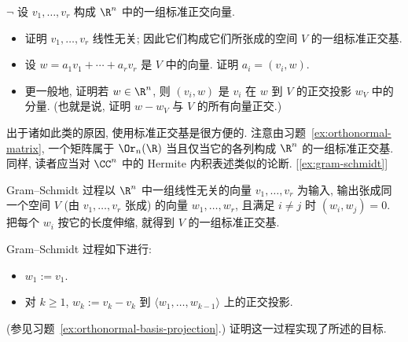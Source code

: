 \begin{prob}\label{ex:orthonormal-basis-projection}
$\neg$ 设 $v_1,\ldots,v_r$ 构成 $\R^n$ 中的一组标准正交向量.
\begin{itemize}
	\item 证明 $v_1,\ldots,v_r$ 线性无关; 因此它们构成它们所张成的空间 $V$ 的一组标准正交基.
	\item 设 $w=a_1v_1+\cdots+a_rv_r$ 是 $V$ 中的向量. 证明 $a_i=(v_i,w)$.
	\item 更一般地, 证明若 $w\in\R^n$, 则 $(v_i,w)$ 是 $v_i$ 在 $w$ 到 $V$ 的正交投影 $w_V$ 中的分量. (也就是说, 证明 $w-w_V$ 与 $V$ 的所有向量正交.)
\end{itemize}
\begin{center}
\end{center}
出于诸如此类的原因, 使用标准正交基是很方便的. 注意由习题~\ref{ex:orthonormal-matrix}, 一个矩阵属于 $\Or_n(\R)$ 当且仅当它的各列构成 $\R^n$ 的一组标准正交基. 同样, 读者应当对 $\CC^n$ 中的 Hermite 内积表述类似的论断. [\ref{ex:gram-schmidt}]
\end{prob}

\begin{prob}\label{ex:gram-schmidt}
Gram--Schmidt 过程以 $\R^n$ 中一组线性无关的向量 $v_1,\ldots,v_r$ 为输入, 输出张成同一个空间 $V$ (由 $v_1,\ldots,v_r$ 张成) 的向量 $w_1,\ldots,w_r$, 且满足 $i\neq j$ 时 $(w_i,w_j)=0$. 把每个 $w_i$ 按它的长度伸缩, 就得到 $V$ 的一组标准正交基.

Gram--Schmidt 过程如下进行:
\begin{itemize}
	\item $w_1:=v_1$.
	\item 对 $k\ge1$, $w_k:=v_k-v_k$ 到 $\langle w_1,\ldots,w_{k-1}\rangle$ 上的正交投影.
\end{itemize}
(参见习题~\ref{ex:orthonormal-basis-projection}.) 证明这一过程实现了所述的目标.
\end{prob}

